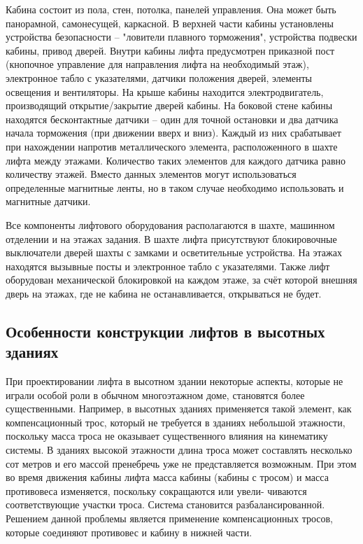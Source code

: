 		Кабина состоит из пола, стен, потолка, панелей управления. Она может быть панорамной,
			самонесущей, каркасной. В верхней части кабины установлены устройства безопасности
			-- "ловители плавного торможения", устройства подвески кабины, привод дверей.
			Внутри кабины лифта предусмотрен приказной пост (кнопочное управление для
			направления лифта на необходимый этаж), электронное табло с указателями,
			датчики положения дверей, элементы освещения и вентиляторы.
			На крыше кабины находится электродвигатель, производящий открытие/закрытие дверей кабины.
			На боковой стене кабины находятся бесконтактные датчики – один для точной остановки
			и два датчика начала торможения (при движении вверх и вниз).
			Каждый из них срабатывает при нахождении напротив металлического элемента,
			расположенного в шахте лифта между этажами. Количество таких элементов для
			каждого датчика равно количеству этажей. Вместо данных элементов
			могут использоваться определенные магнитные ленты, но в таком случае
			необходимо использовать и магнитные датчики. 

		Все компоненты лифтового оборудования располагаются в шахте, машинном отделении и на этажах задания.
			В шахте лифта присутствуют блокировочные выключатели дверей шахты с замками и осветительные устройства.
			На этажах находятся вызывные посты и электронное табло с указателями.
			Также лифт оборудован механической блокировкой на каждом этаже,
			за счёт которой внешняя дверь на этажах, где не кабина не останавливается, открываться не будет. 

	\subsection{Особенности конструкции лифтов в высотных зданиях}

		При проектировании лифта в высотном здании некоторые аспекты,
			которые не играли особой роли в обычном многоэтажном доме, становятся более существенными.
			Например, в высотных зданиях применяется такой элемент, как компенсационный трос,
			который не требуется в зданиях небольшой этажности, поскольку масса троса не оказывает
			существенного влияния на кинематику системы. В зданиях высокой этажности длина троса может
			составлять несколько сот метров и его массой пренебречь уже не представляется возможным.
			При этом во время движения кабины лифта масса кабины (кабины с тросом) и масса противовеса изменяется,
			поскольку сокращаются или увели- чиваются соответствующие участки троса.
			Система становится разбалансированной. Решением данной проблемы является применение
			компенсационных тросов, которые соединяют противовес и кабину в нижней части. 

